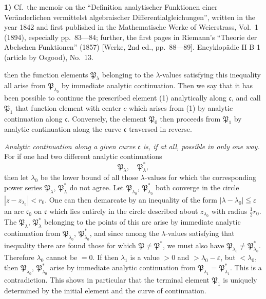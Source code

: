 \documentclass{article}
\begin{document}
\textbf{1)} Cf.\ the memoir on the ``Definition analytischer Funktionen einer Veränderlichen vermittelst algebraischer Differentialgleichungen'', written in the year 1842 and first published in the Mathematische Werke of Weierstrass, Vol.\ 1 (1894), especially pp.\ 83---84; further, the first pages in Riemann's ``Theorie der Abelschen Funktionen'' (1857) [Werke, 2nd ed., pp.\ 88---89]. Encyklopädie II B 1 (article by Osgood), No.\ 13.

then the function elements $\mathfrak{P}_\lambda$ belonging to the $\lambda$-values satisfying this inequality all arise from $\mathfrak{P}_{\lambda_0}$ by immediate analytic continuation. Then we say that it has been possible to continue the prescribed element (1) analytically along $\mathfrak{c}$, and call $\mathfrak{P}_1$ that function element with center $c$ which arises from (1) by analytic continuation along $\mathfrak{c}$. Conversely, the element $\mathfrak{P}_0$ then proceeds from $\mathfrak{P}_1$ by analytic continuation along the curve $\mathfrak{c}$ traversed in reverse.

\emph{Analytic continuation along a given curve $\mathfrak{c}$ is, if at all, possible in only one way.} For if one had two different analytic continuations
\[ \mathfrak{P}_\lambda, \quad \mathfrak{P}_\lambda^*, \]
then let $\lambda_0$ be the lower bound of all those $\lambda$-values for which the corresponding power series $\mathfrak{P}_\lambda$, $\mathfrak{P}_\lambda^*$ do not agree. Let $\mathfrak{P}_{\lambda_0}$, $\mathfrak{P}_{\lambda_0}^*$ both converge in the circle $|z - z_{\lambda_0}| < r_0$. One can then demarcate by an inequality of the form $|\lambda - \lambda_0| \leqq \varepsilon$ an arc $\mathfrak{c}_0$ on $\mathfrak{c}$ which lies entirely in the circle described about $z_{\lambda_0}$ with radius $\frac{1}{2}r_0$. The $\mathfrak{P}_\lambda$, $\mathfrak{P}_\lambda^*$ belonging to the points of this arc arise by immediate analytic continuation from $\mathfrak{P}_{\lambda_0}$, $\mathfrak{P}_{\lambda_0}^*$, and since among the $\lambda$-values satisfying that inequality there are found those for which $\mathfrak{P} \neq \mathfrak{P}^*$, we must also have $\mathfrak{P}_{\lambda_0} \neq \mathfrak{P}_{\lambda_0}^*$. Therefore $\lambda_0$ cannot be $= 0$. If then $\lambda_1$ is a value $> 0$ and $> \lambda_0 - \varepsilon$, but $< \lambda_0$, then $\mathfrak{P}_{\lambda_0}$, $\mathfrak{P}_{\lambda_0}^*$ arise by immediate analytic continuation from $\mathfrak{P}_{\lambda_1} = \mathfrak{P}_{\lambda_1}^*$. This is a contradiction. This shows in particular that the terminal element $\mathfrak{P}_1$ is uniquely determined by the initial element and the curve of continuation.
\end{document}
